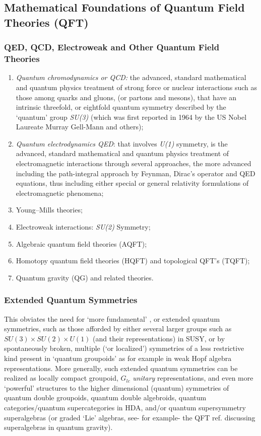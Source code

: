 \documentclass[12pt]{article}
\theoremstyle{plain}
\theoremstyle{definition}
\numberwithin{equation}{section}
\begin{document}
\subsection{Mathematical Foundations of Quantum Field Theories (QFT)}

\subsubsection{QED, QCD, Electroweak and Other Quantum Field Theories}

\begin{enumerate}
\item \textit{Quantum chromodynamics or QCD:} the advanced, standard mathematical and quantum physics treatment of strong force or nuclear interactions such as those among quarks and gluons, (or partons and mesons), that have an intrinsic threefold, or eightfold quantum symmetry described by the `quantum' group {\em SU(3)} (which was first reported in 1964 by the US Nobel Laureate Murray Gell-Mann and others); 
\item {\em Quantum electrodynamics QED}: that involves {\em U(1)} symmetry, is the advanced, standard mathematical and quantum physics treatment of electromagnetic interactions through several approaches, the more advanced including the path-integral approach by Feynman, Dirac's operator and QED equations, thus including either special or general
relativity formulations of electromagnetic phenomena;
\item Young--Mills theories;
\item Electroweak interactions: {\em SU(2)} Symmetry;
\item Algebraic quantum field theories (AQFT);
\item Homotopy quantum field theories (HQFT) and topological QFT's (TQFT); 
\item Quantum gravity (QG) and related theories.
\end{enumerate}

\subsubsection{Extended Quantum Symmetries}

 This obviates the need for `more fundamental' , or extended quantum symmetries, such as those afforded by either several larger groups such as $SU(3)  \times SU(2) \times U(1)$ (and their representations) in SUSY, or by spontaneously broken, multiple (`or localized') symmetries of a less restrictive kind present in `quantum groupoids' as for example in weak Hopf algebra representations. More generally, such extended quantum symmetries can be realized as locally compact groupoid, {\em $G_{lc}$} {\em unitary} representations, and even more `powerful' structures to the higher dimensional (quantum) symmetries of quantum double groupoids, quantum double algebroids, quantum categories/quantum supercategories in HDA, and/or quantum supersymmetry superalgebras (or graded `Lie' algebras, see- for example- the QFT ref. \cite{Weinberg2003} discussing superalgebras in quantum gravity). 
 
\end{document}
